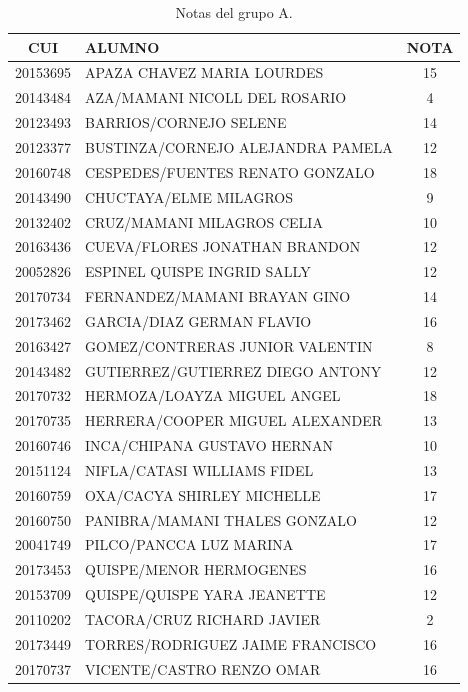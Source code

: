         \begin{table}[H]
        \centering
            \caption{Notas del grupo A.}
            \begin{tabular}{|c|p{10cm}|c|}
                \hline 
                \textbf{CUI} & \textbf{ALUMNO} & \textbf{NOTA}  \\ \hline
        20153695 & APAZA CHAVEZ MARIA LOURDES & 15 \\ \hline 
            20143484 & AZA/MAMANI NICOLL DEL ROSARIO & 4 \\ \hline 
            20123493 & BARRIOS/CORNEJO SELENE & 14 \\ \hline 
            20123377 & BUSTINZA/CORNEJO ALEJANDRA PAMELA & 12 \\ \hline 
            20160748 & CESPEDES/FUENTES RENATO GONZALO & 18 \\ \hline 
            20143490 & CHUCTAYA/ELME MILAGROS & 9 \\ \hline 
            20132402 & CRUZ/MAMANI MILAGROS CELIA & 10 \\ \hline 
            20163436 & CUEVA/FLORES JONATHAN BRANDON & 12 \\ \hline 
            20052826 & ESPINEL QUISPE INGRID SALLY & 12 \\ \hline 
            20170734 & FERNANDEZ/MAMANI BRAYAN GINO & 14 \\ \hline 
            20173462 & GARCIA/DIAZ GERMAN FLAVIO & 16 \\ \hline 
            20163427 & GOMEZ/CONTRERAS JUNIOR VALENTIN & 8 \\ \hline 
            20143482 & GUTIERREZ/GUTIERREZ DIEGO ANTONY & 12 \\ \hline 
            20170732 & HERMOZA/LOAYZA MIGUEL ANGEL & 18 \\ \hline 
            20170735 & HERRERA/COOPER MIGUEL ALEXANDER & 13 \\ \hline 
            20160746 & INCA/CHIPANA GUSTAVO HERNAN & 10 \\ \hline 
            20151124 & NIFLA/CATASI WILLIAMS FIDEL & 13 \\ \hline 
            20160759 & OXA/CACYA SHIRLEY MICHELLE & 17 \\ \hline 
            20160750 & PANIBRA/MAMANI THALES GONZALO & 12 \\ \hline 
            20041749 & PILCO/PANCCA LUZ MARINA & 17 \\ \hline 
            20173453 & QUISPE/MENOR HERMOGENES & 16 \\ \hline 
            20153709 & QUISPE/QUISPE YARA JEANETTE & 12 \\ \hline 
            20110202 & TACORA/CRUZ RICHARD JAVIER & 2 \\ \hline 
            20173449 & TORRES/RODRIGUEZ JAIME FRANCISCO & 16 \\ \hline 
            20170737 & VICENTE/CASTRO RENZO OMAR & 16 \\ \hline 
            		
            \end{tabular}
        \end{table}	
        